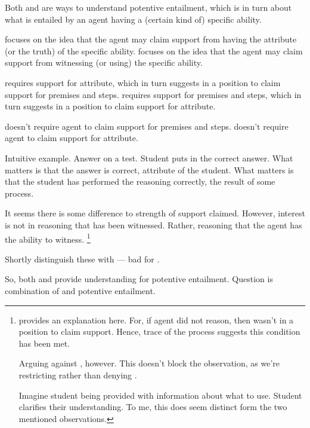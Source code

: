 \begin{note}
  Both \AR{} and \WR{} are ways to understand potentive entailment, which is in turn about what is entailed by an agent having a (certain kind of) specific ability.

  \AR{} focuses on the idea that the agent may claim support from having the attribute (or the truth) of the specific ability.
  \WR{} focuses on the idea that the agent may claim support from witnessing (or using) the specific ability.

  \AR{} requires support for attribute, which in turn suggests in a position to claim support for premises and steps.
  \WR{} requires support for premises and steps, which in turn suggests in a position to claim support for attribute.

  \AR{} doesn't require agent to claim support for premises and steps.
  \WR{} doesn't require agent to claim support for attribute.

  Intuitive example.
  Answer on a test.
  Student puts in the correct answer.
  What matters is that the answer is correct, attribute of the student.
  What matters is that the student has performed the reasoning correctly, the result of some process.

  It seems there is some difference to strength of support claimed.
  However, interest is not in reasoning that has been witnessed.
  Rather, reasoning that the agent has the ability to witness.\nolinebreak
  \footnote{
    \uRa{} provides an explanation here.
    For, if agent did not reason, then wasn't in a position to claim support.
    Hence, trace of the process suggests this condition has been met.

    Arguing against \uRa{}, however.
    This doesn't block the observation, as we're restricting \uRa{} rather than denying \uRa{}.

    Imagine student being provided with information about what to use.
    Student clarifies their understanding.
    To me, this does seem distinct form the two mentioned observations.
  }

  Shortly distinguish these with \uRa{} --- bad for \WR{}.
\end{note}

\begin{note}
  So, both \AR{} and \WR{} provide understanding for potentive entailment.
  Question is combination of \GSI{} and potentive entailment.
\end{note}

